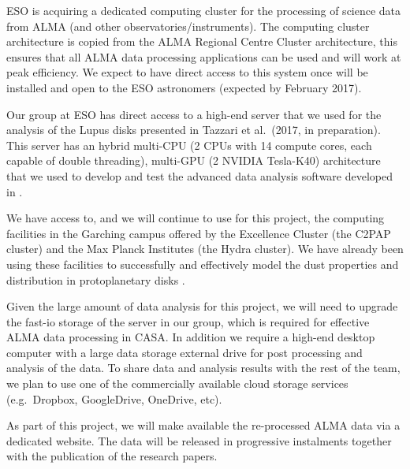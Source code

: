 \documentclass[10pt,fleqn,twoside]{article}
\begin{document}
ESO is acquiring a dedicated computing cluster for the processing of science data from ALMA (and other observatories/instruments). The computing cluster architecture is copied from the ALMA Regional Centre Cluster architecture, this ensures that all ALMA data processing applications can be used and will work at peak efficiency. We expect to have direct access to this system once will be installed and open to the ESO astronomers (expected by February 2017). 

Our group at ESO has direct access to a high-end server that we used for the analysis of the Lupus disks presented in Tazzari et al.~(2017, in preparation). This server has an hybrid multi-CPU (2 CPUs with 14 compute cores, each capable of double threading), multi-GPU (2 NVIDIA Tesla-K40) architecture that we used to develop and test the advanced data analysis software developed in \citet{TazzariPhD}. 

We have access to, and we will continue to use for this project, the computing facilities in the Garching campus offered by the Excellence Cluster (the C2PAP cluster) and the Max Planck Institutes (the Hydra cluster). We have already been using these facilities to successfully and effectively model the dust properties and distribution in protoplanetary disks \citep{2016A&A...588A.112G,2016A&A...588A..53T,TazzariPhD}.

Given the large amount of data analysis for this project, we will need to upgrade the fast-io storage of the server in our group, which is required for effective ALMA data processing in CASA. In addition we require a high-end desktop computer with a large data storage external drive for post processing and analysis of the data. To share data and analysis results with the rest of the team, we plan to use one of the commercially available cloud storage services (e.g.\ Dropbox, GoogleDrive, OneDrive, etc). 

As part of this project, we will make available the re-processed ALMA data via a dedicated website. The data will be released in progressive instalments together with the publication of the research papers.

% 
% 
% 
\end{document}
